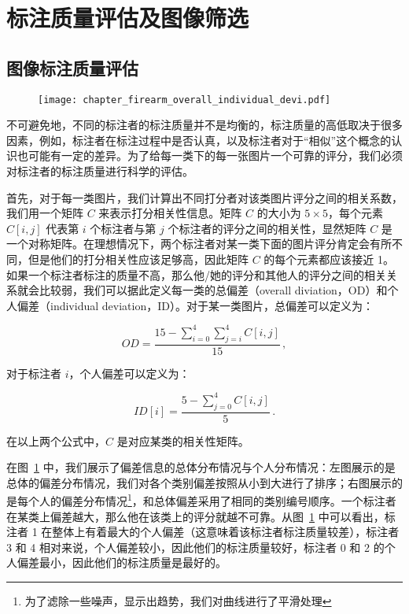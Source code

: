 \section{标注质量评估及图像筛选}\label{sec:label_quality_assess_filtering}
\subsection{图像标注质量评估}

\begin{figure}[t]
	\centering
	\texttt{[image: chapter\_firearm\_overall\_individual\_devi.pdf]}
	\label{fig:deviation_info}
\end{figure}

不可避免地，不同的标注者的标注质量并不是均衡的，标注质量的高低取决于很多因素，例如，标注者在标注过程中是否认真，以及标注者对于“相似”这个概念的认识也可能有一定的差异。为了给每一类下的每一张图片一个可靠的评分，我们必须对标注者的标注质量进行科学的评估。

首先，对于每一类图片，我们计算出不同打分者对该类图片评分之间的相关系数，我们用一个矩阵 $C$ 来表示打分相关性信息。矩阵 $C$ 的大小为 $5 \times 5$，每个元素 $C[i,j]$ 代表第 $i$ 个标注者与第 $j$ 个标注者的评分之间的相关性，显然矩阵 $C$ 是一个对称矩阵。在理想情况下，两个标注者对某一类下面的图片评分肯定会有所不同，但是他们的打分相关性应该足够高，因此矩阵 $C$ 的每个元素都应该接近 1。如果一个标注者标注的质量不高，那么他/她的评分和其他人的评分之间的相关关系就会比较弱，我们可以据此定义每一类的总偏差（overall diviation，OD）和个人偏差（individual deviation，ID）。对于某一类图片，总偏差可以定义为：

\begin{equation}
OD = \frac{15 - \sum_{i=0}^{4}\sum_{j=i}^{4}C[i,j]}{15}\, ,
\end{equation}

\noindent 对于标注者 $i$，个人偏差可以定义为：

\begin{equation}
	ID[i] = \frac{5 - \sum_{j=0}^{4}C[i, j]}{5}\, .
\end{equation}

\noindent 在以上两个公式中，$C$ 是对应某类的相关性矩阵。

在图~\ref{fig:deviation_info} 中，我们展示了偏差信息的总体分布情况与个人分布情况：左图展示的是总体的偏差分布情况，我们对各个类别偏差按照从小到大进行了排序；右图展示的是每个人的偏差分布情况\footnote{为了滤除一些噪声，显示出趋势，我们对曲线进行了平滑处理}，和总体偏差采用了相同的类别编号顺序。一个标注者在某类上偏差越大，那么他在该类上的评分就越不可靠。从图~\ref{fig:deviation_info} 中可以看出，标注者 1 在整体上有着最大的个人偏差（这意味着该标注者标注质量较差），标注者 3 和 4 相对来说，个人偏差较小，因此他们的标注质量较好，标注者 0 和 2 的个人偏差最小，因此他们的标注质量是最好的。

